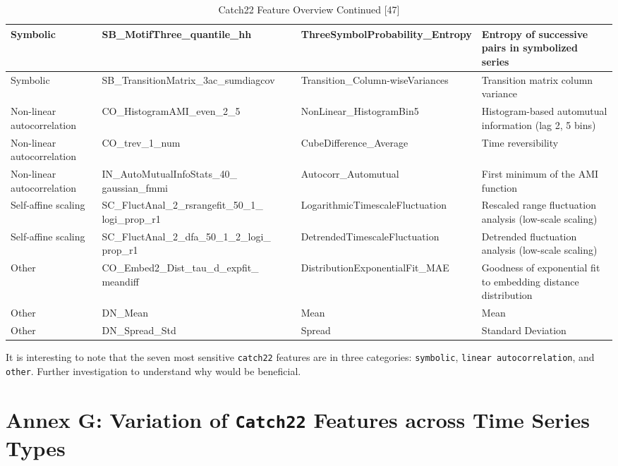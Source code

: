 \documentclass{article}
\begin{document}
\begin{table}[H]

\caption{\label{tab:unnamed-chunk-23}Catch22 Feature Overview Continued [47]}
\centering
\begin{tabular}[t]{>{\raggedright\arraybackslash}p{0.7in}|>{\raggedright\arraybackslash}p{2.3in}|>{\raggedright\arraybackslash}p{2.1in}|>{\raggedright\arraybackslash}p{1in}}
\hline
Symbolic & SB\_MotifThree\_quantile\_hh & ThreeSymbolProbability\_Entropy & Entropy of successive pairs in symbolized series\\
\hline
Symbolic & SB\_TransitionMatrix\_3ac\_sumdiagcov & Transition\_Column-wiseVariances & Transition matrix column variance\\
\hline
Non-linear autocorrelation & CO\_HistogramAMI\_even\_2\_5 & NonLinear\_HistogramBin5 & Histogram-based automutual information (lag 2, 5 bins)\\
\hline
Non-linear autocorrelation & CO\_trev\_1\_num & CubeDifference\_Average & Time reversibility\\
\hline
Non-linear autocorrelation & IN\_AutoMutualInfoStats\_40\_ gaussian\_fmmi & Autocorr\_Automutual & First minimum of the AMI function\\
\hline
Self-affine scaling & SC\_FluctAnal\_2\_rsrangefit\_50\_1\_ logi\_prop\_r1 & LogarithmicTimescaleFluctuation & Rescaled range fluctuation analysis (low-scale scaling)\\
\hline
Self-affine scaling & SC\_FluctAnal\_2\_dfa\_50\_1\_2\_logi\_ prop\_r1 & DetrendedTimescaleFluctuation & Detrended fluctuation analysis (low-scale scaling)\\
\hline
Other & CO\_Embed2\_Dist\_tau\_d\_expfit\_ meandiff & DistributionExponentialFit\_MAE & Goodness of exponential fit to embedding distance distribution\\
\hline
Other & DN\_Mean & Mean & Mean\\
\hline
Other & DN\_Spread\_Std & Spread & Standard Deviation\\
\hline
\end{tabular}
\end{table}

It is interesting to note that the seven most sensitive \texttt{catch22}
features are in three categories: \texttt{symbolic},
\texttt{linear\ autocorrelation}, and \texttt{other}. Further
investigation to understand why would be beneficial.

\newpage

\hypertarget{annex-g-variation-of-catch22-features-across-time-series-types}{%
\section{\texorpdfstring{Annex G: Variation of \texttt{Catch22} Features
across Time Series
Types}{Annex G: Variation of Catch22 Features across Time Series Types}}\label{annex-g-variation-of-catch22-features-across-time-series-types}}
\end{document}

